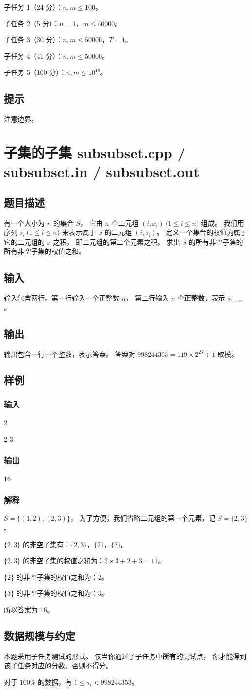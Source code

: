 \documentclass[UTF8]{article}
\newcommand \Problem [2] {\newpage \section{#1 \small{#2.cpp / #2.in / #2.out}}}
\newcommand \Description {\subsection{题目描述}}
\newcommand \Input {\subsection{输入}}
\newcommand \Output {\subsection{输出}}
\newcommand \Sample [1][] {\subsection{样例 #1}}
\newcommand \SampleInput {\subsubsection{输入}}
\newcommand \SampleOutput {\subsubsection{输出}}
\newcommand \Explanation {\subsubsection{解释}}
\newcommand \Constraint {\subsection{数据规模与约定}}
\newcommand \Hint {\subsection{提示}}
\begin{document}
	子任务 1（24 分）：$n, m \le 100$。

	子任务 2（5 分）：$n = 1$，$m \le 50000$。

	子任务 3（30 分）：$n, m \le 50000$，$T = 1$。

	子任务 4（41 分）：$n, m \le 50000$。

	子任务 5（100 分）：$n, m \le 10^{18}$。

	\Hint

	注意边界。

	\Problem {子集的子集} {subsubset}
	\Description

	有一个大小为 $n$ 的集合 $S$，
	它由 $n$ 个二元组 $(i, x_i) \pod {1 \le i \le n}$ 组成。
	我们用序列 $s_i \pod {1 \le i \le n}$ 来表示属于 $S$ 的二元组 $(i, s_i)$。
	定义一个集合的权值为属于它的二元组的 $x$ 之积，
	即二元组的第二个元素之积。
	求出 $S$ 的所有非空子集的所有非空子集的权值之和。

	\Input

	输入包含两行。第一行输入一个正整数 $n$，
	第二行输入 $n$ 个\textbf{正整数}，表示 $s_{1 \sim n}$。

	\Output

	输出包含一行一个整数，表示答案。
	答案对 $998244353 = 119 \times 2^{23} + 1$ 取模。

	\Sample

	\SampleInput

	2

	2 3

	\SampleOutput

	16

	\Explanation

	$S = \{ (1, 2), (2, 3) \}$，
	为了方便，我们省略二元组的第一个元素，记 $S = \{ 2, 3 \}$。

	\bigskip

	$\{ 2, 3 \}$ 的非空子集有：$\{ 2, 3 \}$，$\{ 2 \}$，$\{ 3 \}$。

	$\{ 2, 3 \}$ 的非空子集的权值之和为：$2 \times 3 + 2 + 3 = 11$。

	$\{ 2 \}$ 的非空子集的权值之和为：$2$。

	$\{ 3 \}$ 的非空子集的权值之和为：$3$。

	所以答案为 $16$。

	\Constraint

	本题采用子任务测试的形式。
	仅当你通过了子任务中\textbf{所有}的测试点，
	你才能得到该子任务对应的分数，否则不得分。

	\bigskip

	对于 $100\%$ 的数据，有 $1 \le s_i < 998244353$。
\end{document}
